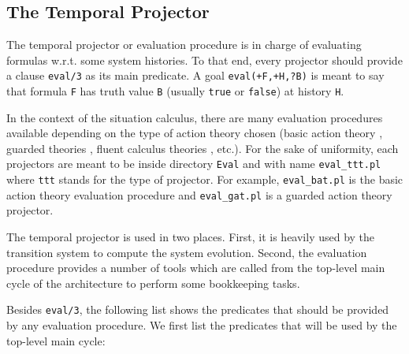 \documentclass[11pt]{article}
\begin{document}
\subsection{The Temporal Projector}

The temporal projector or evaluation procedure is in charge of evaluating
formulas w.r.t. some system histories. To that end, every projector should
provide a clause \texttt{eval/3} as its main predicate. A goal
\texttt{eval(+F,+H,?B)} is meant to say that formula \texttt{F} has truth value
\texttt{B} (usually \texttt{true} or \texttt{false}) at history \texttt{H}.

In the context of the situation calculus, there are many evaluation procedures
available depending on the type of action theory chosen (basic action theory
\cite{Pirri99-ContSitCalc}, guarded theories \cite{Giuseppe99-GAT}, fluent
calculus theories \cite{Thielscher00}, etc.). 
%
For the sake of uniformity, each projectors are meant to be inside directory
\texttt{Eval} and with name \texttt{eval\_ttt.pl} where \texttt{ttt} stands
for the type of projector. For example, \texttt{eval\_bat.pl} is the basic
action theory evaluation procedure and \texttt{eval\_gat.pl} is a guarded
action theory projector.


The temporal projector is used in two places. First, it is heavily used by the
transition system to compute the system evolution.  
%
Second, the evaluation procedure provides a number of tools which are called
from the top-level main cycle of the architecture to perform some bookkeeping
tasks.

Besides \texttt{eval/3}, the following list shows the predicates that should be
provided by any evaluation procedure. We first list the predicates that will be
used by the top-level main cycle:
\end{document}
